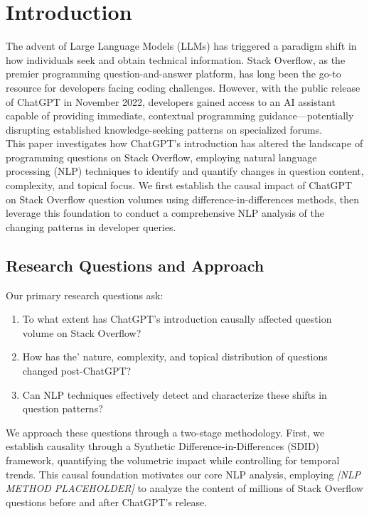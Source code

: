 \section{Introduction}
The advent of Large Language Models (LLMs) has triggered a paradigm shift in how individuals seek and obtain technical information. Stack Overflow, as the premier programming question-and-answer platform, has long been the go-to resource for developers facing coding challenges. However, with the public release of ChatGPT in November 2022, developers gained access to an AI assistant capable of providing immediate, contextual programming guidance—potentially disrupting established knowledge-seeking patterns on specialized forums.\\

This paper investigates how ChatGPT's introduction has altered the landscape of programming questions on Stack Overflow, employing natural language processing (NLP) techniques to identify and quantify changes in question content, complexity, and topical focus. We first establish the causal impact of ChatGPT on Stack Overflow question volumes using difference-in-differences methods, then leverage this foundation to conduct a comprehensive NLP analysis of the changing patterns in developer queries.

\subsection{Research Questions and Approach}
Our primary research questions ask: 
\begin{enumerate}
    \item To what extent has ChatGPT's introduction causally affected question volume on Stack Overflow?
    \item How has the' nature, complexity, and topical distribution of questions changed post-ChatGPT?
    \item Can NLP techniques effectively detect and characterize these shifts in question patterns?
\end{enumerate}

We approach these questions through a two-stage methodology. First, we establish causality through a Synthetic Difference-in-Differences (SDID) framework, quantifying the volumetric impact while controlling for temporal trends. This causal foundation motivates our core NLP analysis, employing \textit{[NLP METHOD PLACEHOLDER]} to analyze the content of millions of Stack Overflow questions before and after ChatGPT's release.\\

